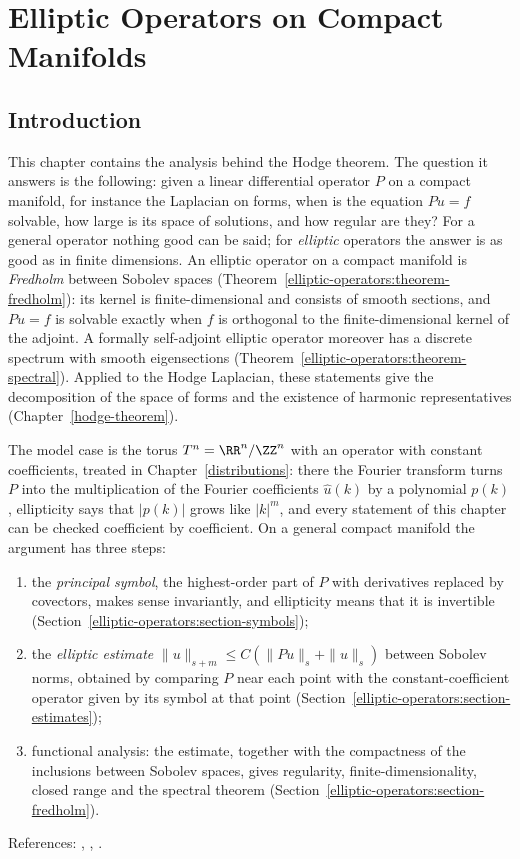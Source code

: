 \chapter{Elliptic Operators on Compact Manifolds}\label{elliptic-operators}

\section{Introduction}\label{elliptic-operators:section-introduction}

This chapter contains the analysis behind the Hodge theorem. The question it answers is the following: given a linear differential operator $P$ on a compact manifold, for instance the
Laplacian on forms, when is the equation $Pu = f$ solvable, how large is its space of solutions, and how regular are they? For a general operator nothing good can be said; for
\emph{elliptic} operators the answer is as good as in finite dimensions. An elliptic operator on a compact manifold is \emph{Fredholm} between Sobolev spaces
(Theorem~\ref{elliptic-operators:theorem-fredholm}): its kernel is finite-dimensional and consists of smooth sections, and $Pu = f$ is solvable exactly when $f$ is orthogonal to the
finite-dimensional kernel of the adjoint. A formally self-adjoint elliptic operator moreover has a discrete spectrum with smooth eigensections
(Theorem~\ref{elliptic-operators:theorem-spectral}). Applied to the Hodge Laplacian, these statements give the decomposition of the space of forms and the existence of harmonic representatives
(Chapter~\ref{hodge-theorem}).

The model case is the torus $T^n = \RR^n/\ZZ^n$ with an operator with constant coefficients, treated in Chapter~\ref{distributions}: there the Fourier transform turns $P$ into the multiplication of
the Fourier coefficients $\hat u(k)$ by a polynomial $p(k)$, ellipticity says that $|p(k)|$ grows like $|k|^m$, and every statement of this chapter can be checked coefficient by coefficient. On a
general compact manifold the argument has three steps:
\begin{enumerate}
\item the \emph{principal symbol}, the highest-order part of $P$ with derivatives replaced by covectors, makes sense invariantly, and ellipticity means that it is invertible
(Section~\ref{elliptic-operators:section-symbols});
\item the \emph{elliptic estimate} $\|u\|_{s+m} \leq C(\|Pu\|_s + \|u\|_s)$ between Sobolev norms, obtained by comparing $P$ near each point with the constant-coefficient operator given by its
symbol at that point (Section~\ref{elliptic-operators:section-estimates});
\item functional analysis: the estimate, together with the compactness of the inclusions between Sobolev spaces, gives regularity, finite-dimensionality, closed range and the spectral theorem
(Section~\ref{elliptic-operators:section-fredholm}).
\end{enumerate}
References: \cite[Chapter 6]{warner-foundations}, \cite[Chapter 4]{wells-differential-analysis}, \cite{hormander-pdo1}.

